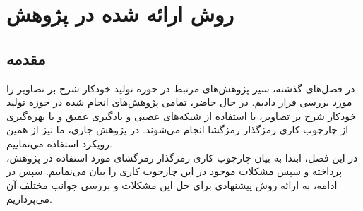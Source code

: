 \chapter{روش ارائه شده در پژوهش}

\section{مقدمه}
در فصل‌های گذشته، سیر پژوهش‌‌های مرتبط در حوزه تولید خودکار شرح بر تصاویر را مورد بررسی قرار دادیم. در حال حاضر، تمامی پژوهش‌های انجام شده در حوزه تولید خودکار شرح بر تصاویر، با استفاده از شبکه‌های عصبی و یادگیری عمیق و با بهره‌گیری از چارچوب کاری رمزگذار-رمزگشا انجام می‌شوند. در پژوهش جاری، ما نیز از همین رویکرد استفاده می‌نماییم. 
\\
در این فصل، ابتدا به بیان چارچوب کاری رمزگذار-رمزگشای مورد استفاده در پژوهش، پرداخته و سپس مشکلات موجود در این چارجوب کاری را بیان می‌نماییم. سپس در ادامه، به ارائه روش پیشنهادی برای حل این مشکلات و بررسی جوانب مختلف آن می‌پردازیم.

